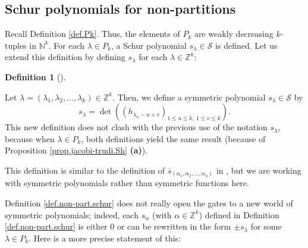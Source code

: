 \documentclass[numbers=enddot,12pt,final,onecolumn,notitlepage]{scrartcl}%
\theoremstyle{definition}
\newtheorem{defi}[theo]{Definition}
\newenvironment{definition}[1][]
{\begin{defi}[#1]\begin{leftbar}}
{\end{leftbar}\end{defi}}
\begin{document}
\subsection{Schur polynomials for non-partitions}

Recall Definition \ref{def.Pk}. Thus, the elements of $P_{k}$ are weakly
decreasing $k$-tuples in $\mathbb{N}^{k}$. For each $\lambda\in P_{k}$, a
Schur polynomial $s_{\lambda}\in\mathcal{S}$ is defined. Let us extend this
definition by defining $s_{\lambda}$ for each $\lambda\in\mathbb{Z}^{k}$:

\begin{definition}
\label{def.non-part.schur}Let $\lambda=\left(  \lambda_{1},\lambda_{2}%
,\ldots,\lambda_{k}\right)  \in\mathbb{Z}^{k}$. Then, we define a symmetric
polynomial $s_{\lambda}\in\mathcal{S}$ by%
\begin{equation}
s_{\lambda}=\det\left(  \left(  h_{\lambda_{u}-u+v}\right)  _{1\leq u\leq
k,\ 1\leq v\leq k}\right)  . \label{eq.def.non-part.schur.sla=}%
\end{equation}
This new definition does not clash with the previous use of the notation
$s_{\lambda}$, because when $\lambda\in P_{k}$, both definitions yield the
same result (because of Proposition \ref{prop.jacobi-trudi.Sh} \textbf{(a)}).
\end{definition}

This definition is similar to the definition of $\overline{s}_{\left(
\alpha_{1},\alpha_{2},\ldots,\alpha_{n}\right)  }$ in \cite[Exercise 2.9.1
(c)]{GriRei18}, but we are working with symmetric polynomials rather than
symmetric functions here.

Definition \ref{def.non-part.schur} does not really open the gates to a new
world of symmetric polynomials; indeed, each $s_{\alpha}$ (with $\alpha
\in\mathbb{Z}^{k}$) defined in Definition \ref{def.non-part.schur} is either
$0$ or can be rewritten in the form $\pm s_{\lambda}$ for some $\lambda\in
P_{k}$. Here is a more precise statement of this:
\end{document}
